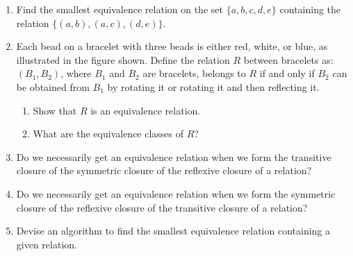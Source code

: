 \documentclass{sig-alternate-05-2015}
\begin{document}
\begin{enumerate}
\item Find the smallest equivalence relation on the set
$\{a, b, c, d, e\}$ containing the relation $\{(a, b), (a, c),
	(d, e)\}$.

\item Each bead on a bracelet with three beads is either red,
white, or blue, as illustrated in the figure shown.
Define the relation $R$ between bracelets as: $(B_1,B_2)$,
where $B_1$ and $B_2$ are bracelets, belongs to $R$ if and only
if $B_2$ can be obtained from $B_1$ by rotating it or rotating it
and then reflecting it.
\begin{enumerate}
	\item Show that $R$ is an equivalence relation.
	\item What are the equivalence classes of $R$?
\end{enumerate}

\item Do we necessarily get an equivalence relation when we
form the transitive closure of the symmetric closure of
the reflexive closure of a relation?

\item Do we necessarily get an equivalence relation when we
form the symmetric closure of the reflexive closure of the
transitive closure of a relation?

\item Devise an algorithm to find the smallest equivalence relation
containing a given relation.

\end{enumerate}
\end{document}
